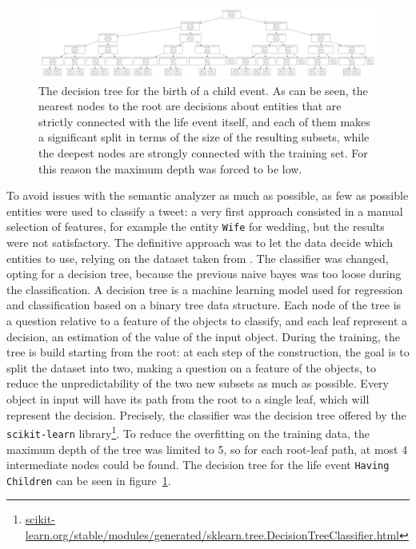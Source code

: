\begin{figure}
\centering
\includegraphics[width=%
1\textwidth]{img/decisiontree}
\caption{The decision tree for the birth of a child event. As can be seen, the nearest nodes to the root are decisions about entities that are strictly connected with the life event itself, and each of them makes a significant split in terms of the size of the resulting subsets, while the deepest nodes are strongly connected with the training set. For this reason the maximum depth was forced to be low.}
\label{fig:decisiontree}
\end{figure}

To avoid issues with the semantic analyzer as much as possible, as few as possible entities were used to classify a tweet: a very first approach consisted in a manual selection of features, for example the entity \texttt{Wife} for wedding, but the results were not satisfactory. The definitive approach was to let the data decide which entities to use, relying on the dataset taken from \cite{dickinson2015identifying}. The classifier was changed, opting for a decision tree, because the previous naive bayes was too loose during the classification. A decision tree is a machine learning model used for regression and classification based on a binary tree data structure. Each node of the tree is a question relative to a feature of the objects to classify, and each leaf represent a decision, an estimation of the value of the input object. During the training, the tree is build starting from the root: at each step of the construction, the goal is to split the dataset into two, making a question on a feature of the objects, to reduce the unpredictability of the two new subsets as much as possible. Every object in input will have its path from the root to a single leaf, which will represent the decision. Precisely, the classifier was the decision tree offered by the \texttt{scikit-learn} library\footnote{\url{scikit-learn.org/stable/modules/generated/sklearn.tree.DecisionTreeClassifier.html}}. To reduce the overfitting on the training data, the maximum depth of the tree was limited to 5, so for each root-leaf path, at most 4 intermediate nodes could be found. The decision tree for the life event \texttt{Having Children} can be seen in figure~\ref{fig:decisiontree}.

